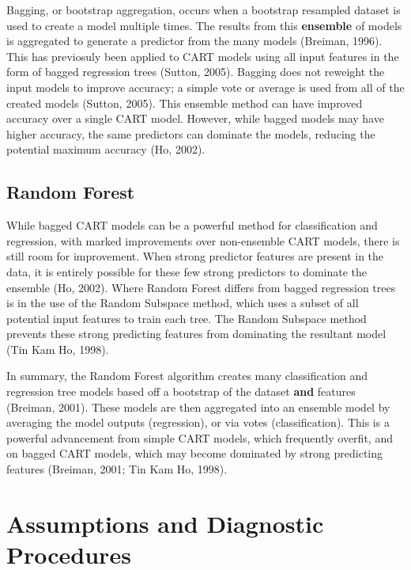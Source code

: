 \documentclass[
]{article}
\begin{document}
Bagging, or bootstrap aggregation, occurs when a bootstrap resampled dataset is used to create a model multiple times. The results from this \textbf{ensemble} of models is aggregated to generate a predictor from the many models (Breiman, 1996). This has previosuly been applied to CART models using all input features in the form of bagged regression trees (Sutton, 2005). Bagging does not reweight the input models to improve accuracy; a simple vote or average is used from all of the created models (Sutton, 2005). This ensemble method can have improved accuracy over a single CART model. However, while bagged models may have higher accuracy, the same predictors can dominate the models, reducing the potential maximum accuracy (Ho, 2002).

\hypertarget{random-forest}{%
\subsection{Random Forest}\label{random-forest}}

While bagged CART models can be a powerful method for classification and regression, with marked improvements over non-ensemble CART models, there is still room for improvement. When strong predictor features are present in the data, it is entirely possible for these few strong predictors to dominate the ensemble (Ho, 2002). Where Random Forest differs from bagged regression trees is in the use of the Random Subspace method, which uses a subset of all potential input features to train each tree. The Random Subspace method prevents these strong predicting features from dominating the resultant model (Tin Kam Ho, 1998).

In summary, the Random Forest algorithm creates many classification and regression tree models based off a bootstrap of the dataset \textbf{and} features (Breiman, 2001). These models are then aggregated into an ensemble model by averaging the model outputs (regression), or via votes (classification). This is a powerful advancement from simple CART models, which frequently overfit, and on bagged CART models, which may become dominated by strong predicting features (Breiman, 2001; Tin Kam Ho, 1998).

\hypertarget{assumptions-and-diagnostic-procedures}{%
\section{Assumptions and Diagnostic Procedures}\label{assumptions-and-diagnostic-procedures}}
\end{document}
